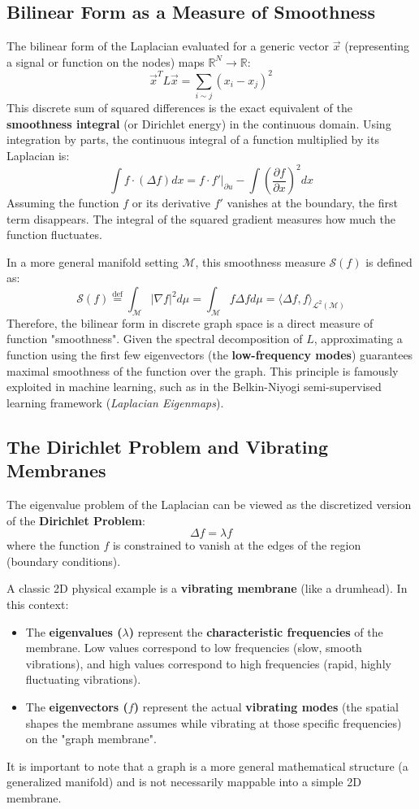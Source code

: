 \subsection{Bilinear Form as a Measure of Smoothness}
The bilinear form of the Laplacian evaluated for a generic vector \( \vec{x} \) (representing a signal or function on the nodes) maps \( \mathbb{R}^N \rightarrow \mathbb{R} \):
\[
    \vec{x}^T L \vec{x} = \sum_{i \sim j} (x_i - x_j)^2
\]
This discrete sum of squared differences is the exact equivalent of the \textbf{smoothness integral} (or Dirichlet energy) in the continuous domain. Using integration by parts, the continuous integral of a function multiplied by its Laplacian is:
\[
    \int f \cdot (\Delta f) dx = \left. f \cdot f' \right|_{\partial u} - \int \left( \frac{\partial f}{\partial x} \right)^2 dx
\]
Assuming the function \( f \) or its derivative \( f' \) vanishes at the boundary, the first term disappears. The integral of the squared gradient measures how much the function fluctuates.

In a more general manifold setting \( \mathcal{M} \), this smoothness measure \( \mathcal{S}(f) \) is defined as:
\[
    \mathcal{S}(f) \overset{\text{def}}{=} \int_{\mathcal{M}} |\nabla f|^2 d\mu = \int_{\mathcal{M}} f \Delta f d\mu = \langle \Delta f, f \rangle_{\mathcal{L}^2(\mathcal{M})}
\]
Therefore, the bilinear form in discrete graph space is a direct measure of function "smoothness". Given the spectral decomposition of \( L \), approximating a function using the first few eigenvectors (the \textbf{low-frequency modes}) guarantees maximal smoothness of the function over the graph. This principle is famously exploited in machine learning, such as in the Belkin-Niyogi semi-supervised learning framework (\textit{Laplacian Eigenmaps}).

\subsection{The Dirichlet Problem and Vibrating Membranes}
The eigenvalue problem of the Laplacian can be viewed as the discretized version of the \textbf{Dirichlet Problem}:
\[
    \Delta f = \lambda f
\]
where the function \( f \) is constrained to vanish at the edges of the region (boundary conditions).

A classic 2D physical example is a \textbf{vibrating membrane} (like a drumhead). In this context:
\begin{itemize}
    \item The \textbf{eigenvalues (\( \lambda \))} represent the \textbf{characteristic frequencies} of the membrane. Low values correspond to low frequencies (slow, smooth vibrations), and high values correspond to high frequencies (rapid, highly fluctuating vibrations).
    \item The \textbf{eigenvectors (\( f \))} represent the actual \textbf{vibrating modes} (the spatial shapes the membrane assumes while vibrating at those specific frequencies) on the "graph membrane".
\end{itemize}
It is important to note that a graph is a more general mathematical structure (a generalized manifold) and is not necessarily mappable into a simple 2D membrane.

